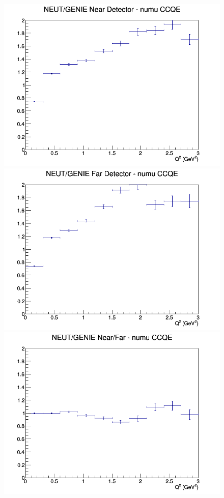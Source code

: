 \begin{figure}[h]
\endminipage
\newline
{}
\includegraphics[width=\linewidth]{eff_Q2/LAr/ratios/CCQE_NEUT_GENIE_numu_near_Q2.png}
\endminipage
{}
\includegraphics[width=\linewidth]{eff_Q2/LAr/ratios/CCQE_NEUT_GENIE_numu_far_Q2.png}
\endminipage
{}
\includegraphics[width=\linewidth]{eff_Q2/LAr/ratios/CCQE_NEUT_GENIE_numu_NF_Q2.png}

\end{figure}
